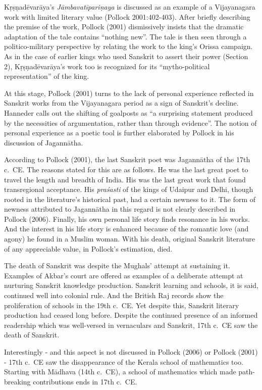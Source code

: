 Kṛṣṇadēvarāya’s {\sl Jāmbavatīpariṇaya} is discussed as an example of a Vijayanagara work with limited literary value (Pollock 2001:402-403). After briefly describing the premise of the work, Pollock (2001) dismissively insists that the dramatic adaptation of the tale contains “nothing new”. The tale is then seen through a politico-military perspective by relating the work to the king’s Orissa campaign. As in the case of earlier kings who used Sanskrit to assert their power (Section 2), Kṛṣṇadēvarāya’s work too is recognized for its “mytho-political representation” of the king.
\vskip 1.5pt

At this stage, Pollock (2001) turns to the lack of personal experience reflected in Sanskrit works from the Vijayanagara period as a sign of Sanskrit’s decline. Hanneder calls out the shifting of goalposts as “a surprising statement produced by the necessities of argumentation, rather than through evidence”. The notion of personal experience as a poetic tool is further elaborated by Pollock in his discussion of Jagannātha. 
\vskip 1.5pt

According to Pollock (2001), the last Sanskrit poet was Jagannātha of the 17th c.\ CE. The reasons stated for this are as follows. He was the last great poet to travel the length and breadth of India. His was the last great work that found transregional acceptance. His {\sl praśasti} of the kings of Udaipur and Delhi, though rooted in the literature’s historical past, had a certain newness to it. The form of newness attributed to Jagannātha in this regard is not clearly described in Pollock (2006). Finally, his own personal life story finds resonance in his works. And the interest in his life story is enhanced because of the romantic love (and agony) he found in a Muslim woman. With his death, original Sanskrit literature of any appreciable value, in Pollock’s estimation, died.
\vskip 1.5pt

The death of Sanskrit was despite the Mughals’ attempt at sustaining it. Examples of Akbar’s court are offered as examples of a deliberate attempt at nurturing Sanskrit knowledge production. Sanskrit learning and schools, it is said, continued well into colonial rule. And the British Raj records show the proliferation of schools in the 19th c.\ CE. Yet despite this, Sanskrit literary production had ceased long before. Despite the continued presence of an informed readership which was well-versed in vernaculars and Sanskrit, 17th c.\ CE saw the death of Sanskrit.

Interestingly - and this aspect is not discussed in Pollock (2006) or Pollock (2001) - 17th c.\ CE saw the disappearance of the Kerala school of mathematics too. Starting with Mādhava (14th c.\ CE), a school of mathematics which made path-breaking contributions ends in 17th c.~CE.

